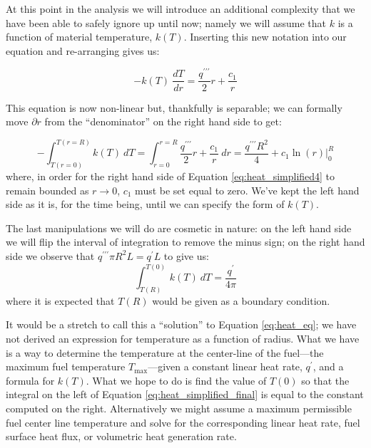 At this point in the analysis we will introduce an additional complexity that we have been able to safely ignore up until now; namely we will assume that $k$ is a function of material temperature, $k(T)$.  Inserting this new notation into our equation and re-arranging gives us:

\begin{equation}
-k(T) \ \frac{dT}{dr} = \frac{q^{\prime \prime \prime}}{2} r + \frac{c_1}{r}
\label{eq:heat_simplified3}
\end{equation}

This equation is now non-linear but, thankfully is separable; we can formally move $\partial r$ from the ``denominator'' on the right hand side to get:

\begin{equation}
-\int_{T(r=0)}^{T(r=R)} k(T) \ dT = \int_{r = 0}^{r = R} \frac{q^{\prime \prime \prime}}{2} r + \frac{c_1}{r} \ dr = \frac{q^{\prime \prime \prime}R^2}{4} + c_1 \ln(r) \Big|_0^R
\label{eq:heat_simplified4}
\end{equation}
where, in order for the right hand side of Equation \ref{eq:heat_simplified4} to remain bounded as $r\rightarrow 0$, $c_1$ must be set equal to zero. We've kept the left hand side as it is, for the time being, until we can specify the form of $k(T)$.  

The last manipulations we will do are cosmetic in nature: on the left hand side we will flip the interval of integration to remove the minus sign; on the right hand side we observe that $q^{\prime \prime \prime} \pi R^2 L = q^{\prime}L$ to give us:
\begin{equation}
\int_{T(R)}^{T(0)} k(T) \ dT = \frac{q^{\prime}}{4 \pi}
\label{eq:heat_simplified_final}
\end{equation}
where it is expected that $T(R)$ would be given as a boundary condition.
 
It would be a stretch to call this a ``solution'' to Equation \ref{eq:heat_eq}; we have not derived an expression for temperature as a function of radius.  What we have is a way to determine the temperature at the center-line of the fuel---the maximum fuel temperature $T_{\text{max}}$---given a constant linear heat rate, $q^{\prime}$, and a formula for $k(T)$. What we hope to do is find the value of $T(0)$ so that the integral on the left of Equation \ref{eq:heat_simplified_final} is equal to the constant computed on the right.  Alternatively we might assume a maximum permissible fuel center line temperature and solve for the corresponding linear heat rate, fuel surface heat flux, or volumetric heat generation rate.

